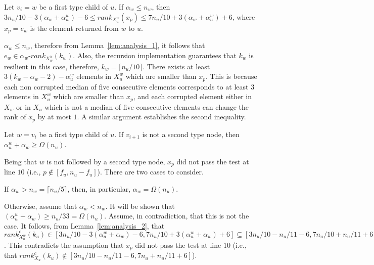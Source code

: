\documentclass{llncs}
\begin{document}
\begin{lemma}
\label{lem:analysis_2}
Let $v_i = w$ be a first type child of $u$. If $\alpha_w \leq n_w$, then $3n_u/10-3(\alpha_w+\alpha_u^w)-6 \leq rank_{X_u^w}(x_p) \leq 7n_u/10+3(\alpha_w+\alpha_u^w)+6$, where $x_p = e_w$ is the element returned from $w$ to $u$.
\end{lemma}

\begin{pf}
$\alpha_w \leq n_w$, therefore from Lemma~\ref{lem:analysis_1}, it follows that $e_w \in \alpha_w\text{-}rank_{X_w^0}(k_w)$. Also, the recursion implementation guarantees that $k_w$ is resilient in this case, therefore, $k_w = \lceil n_u/10 \rceil$. There exists at least $3(k_w - \alpha_w - 2) - \alpha_u^w$ elements in $X_u^w$ which are smaller than $x_p$. This is because each non corrupted median of five consecutive elements corresponds to at least $3$ elements in $X_u^w$ which are smaller than $x_p$, and each corrupted element either in $X_w$ or in $X_u$ which is not a median of five consecutive elements can change the rank of $x_p$ by at most $1$. A similar argument establishes the second inequality.
\end{pf}





\begin{lemma}
\label{lem:first_phase_repetitions}
Let $w = v_i$ be a first type child of $u$. If $v_{i+1}$ is not a second type node, then $\alpha_u^w + \alpha_w \geq \Omega(n_u)$.
\end{lemma}

\begin{pf}
Being that $w$ is not followed by a second type node, $x_p$ did not pass the test at line $10$ (i.e., $p \notin [f_u, n_u-f_u]$). There are two cases to consider.

If $\alpha_w > n_w = \lceil n_u / 5 \rceil$, then, in particular, $\alpha_w = \Omega(n_u)$.

Otherwise, assume that $\alpha_w < n_w$. It will be shown that $(\alpha_u^w + \alpha_w) \geq n_u/33 = \Omega(n_u)$. Assume, in contradiction, that this is not the case. It follows, from Lemma~\ref{lem:analysis_2}, that $rank^c_{X_u^w}(k_u) \in [3n_u/10-3(\alpha_u^w + \alpha_w)-6, 7n_u/10+3(\alpha_u^w + \alpha_w)+6] \subseteq [3n_u/10-n_u/11-6,7n_u/10+n_u/11+6]$. This contradicts the assumption that $x_p$ did not pass the test at line $10$ (i.e., that $rank^c_{X_u}(k_u) \notin[3n_u/10 - n_u/11 - 6, 7n_u + n_u/11 + 6]$).~\end{pf}
\end{document}
